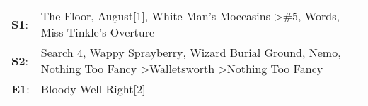 \begin{supertabular}{p{0.03\textwidth}p{0.92\textwidth}}
 \textbf{S1}:  &                                                                    The Floor\textsuperscript{}, \enspace August[1]\textsuperscript{}, \enspace White Man's Moccasins\textsuperscript{} \textgreater \enspace \#5\textsuperscript{}, \enspace Words\textsuperscript{}, \enspace Miss Tinkle's Overture\textsuperscript{}  \enspace  \\
 \textbf{S2}:  &  Search 4\textsuperscript{}, \enspace Wappy Sprayberry\textsuperscript{}, \enspace Wizard Burial Ground\textsuperscript{}, \enspace Nemo\textsuperscript{}, \enspace Nothing Too Fancy\textsuperscript{} \textgreater \enspace Walletsworth\textsuperscript{} \textgreater \enspace Nothing Too Fancy\textsuperscript{}  \enspace  \\
 \textbf{E1}:  &                                                                                                                                                                                                                                                                                  Bloody Well Right[2]\textsuperscript{}  \enspace  \\
\end{supertabular}
